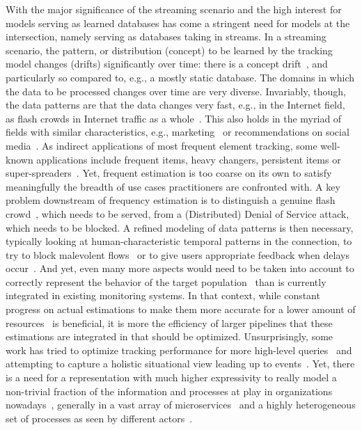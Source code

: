 With the major significance of the streaming scenario and the high interest for models serving as learned databases has come a stringent need for models at the intersection, namely serving as databases taking in streams. In a streaming scenario, the pattern, or distribution (concept) to be learned by the tracking model changes (drifts) significantly over time: there is a concept drift~\cite{Widmer1996,yu2021automatic}, and particularly so compared to, e.g., a mostly static database.
The domains in which the data to be processed changes over time are very diverse. Invariably, though,
the data patterns are that the data changes very fast, e.g., in the Internet field, as flash crowds in Internet traffic as a whole~\cite{ari2003managing}.
This also holds in the myriad of fields with similar characteristics, e.g., marketing~\cite{kotler2005role} or recommendations on social media~\cite{}.
%
As indirect applications of most frequent element tracking, some well-known applications include frequent items, heavy changers, persistent items or super-spreaders~\cite{li2020wavingsketch}.
%
Yet, frequent estimation is too coarse on its own to satisfy meaningfully the breadth of use cases practitioners are confronted with. A key problem downstream of frequency estimation is to distinguish a genuine flash crowd~\cite{ari2003managing,oikonomou2009modeling}, which needs to be served, from a (Distributed) Denial of Service attack, which needs to be blocked. A refined modeling of data patterns is then necessary, typically looking at human-characteristic temporal patterns in the connection, to try to block malevolent flows~\cite{tandon2021defending} or to give users appropriate feedback when delays occur~\cite{tada2021mitigation}. And yet, even many more aspects would need to be taken into account to correctly represent the behavior of the target population~\cite{aljohani2021conducting} than is currently integrated in existing monitoring systems.
% 
In that context, while constant progress on actual estimations to make them more accurate for a lower amount of resources~\cite{huang2018sketchlearn,li2020wavingsketch} is beneficial, it is more the efficiency of larger pipelines that these estimations are integrated in that should be optimized. Unsurprisingly, some work has tried to optimize tracking performance for more high-level queries~\cite{zhao2021cluster,zhang2021cocosketch} and attempting to capture a holistic situational view leading up to events~\cite{husak2021system}. Yet, there is a need for a representation with much higher expressivity to really model a non-trivial fraction of the information and processes at play in organizations nowadays~\cite{turunen2021minimum}, generally in a vast array of microservices~\cite{debroy2019overcoming} and a highly heterogeneous set of processes as seen by different actors~\cite{sousa2019managing}.

